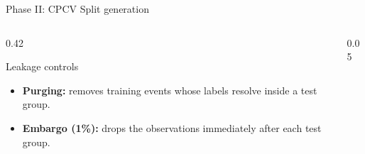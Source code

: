\documentclass[aspectratio=169, t]{beamer}
\begin{document}
\begin{frame}{Phase II: CPCV Split generation}
\begin{columns}[T]
\begin{column}{0.42\textwidth}
{
\begin{block}{Leakage controls}
\footnotesize
\begin{itemize}\setlength{\itemsep}{3pt}
  \item \textbf{Purging:} removes training events whose labels resolve inside a test group.
  \item \textbf{Embargo (1\%):} drops the observations immediately after each test group.
\end{itemize}
\end{block}
}
\end{column}

\begin{column}{0.05\textwidth}\hfill\end{column}
\end{columns}

\end{frame}
\end{document}
